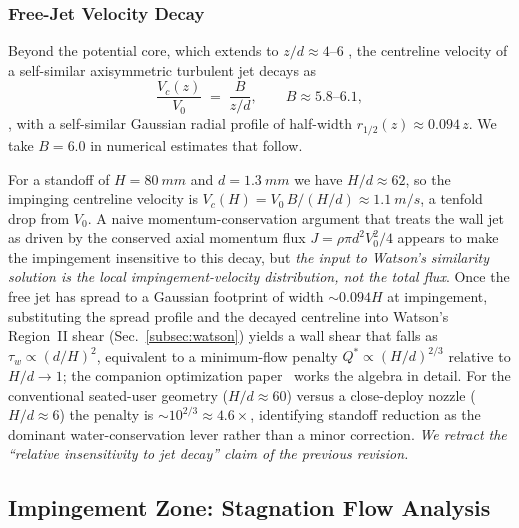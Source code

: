 \documentclass[aps,prfluids,reprint,amsmath,amssymb,floatfix]{revtex4-2}
\begin{document}
\subsubsection{Free-Jet Velocity Decay}

Beyond the potential core, which extends to $z/d \approx 4$--$6$
\citep{HusseinCappGeorge1994,PopeBook}, the centreline velocity of a
self-similar axisymmetric turbulent jet decays as
\begin{equation}
    \frac{V_c(z)}{V_0} \;=\; \frac{B}{z/d},
    \qquad B \approx 5.8\text{--}6.1,
    \label{eq:jetdecay}
\end{equation}
\citep{HusseinCappGeorge1994,PopeBook}, with a self-similar Gaussian
radial profile of half-width $r_{1/2}(z) \approx 0.094\,z$. We take
$B = 6.0$ in numerical estimates that follow.

For a standoff of $H = \SI{80}{mm}$ and $d = \SI{1.3}{mm}$ we have
$H/d \approx 62$, so the impinging centreline velocity is
$V_c(H) = V_0\,B/(H/d) \approx \SI{1.1}{m/s}$, a tenfold drop from $V_0$.
A naive momentum-conservation argument that treats the wall jet as
driven by the conserved axial momentum flux $J = \rho \pi d^2 V_0^2/4$
appears to make the impingement insensitive to this decay, but \emph{the
input to Watson's similarity solution is the local impingement-velocity
distribution, not the total flux}. Once the free jet has spread to a
Gaussian footprint of width $\sim 0.094 H$ at impingement, substituting
the spread profile and the decayed centreline into Watson's
Region~II shear (Sec.~\ref{subsec:watson}) yields a wall shear that
falls as $\tau_w \propto (d/H)^{2}$, equivalent to a minimum-flow penalty
$Q^* \propto (H/d)^{2/3}$ relative to $H/d \to 1$; the companion
optimization paper~\citep{BurtonOptPaper} works the algebra in detail.
For the conventional seated-user geometry ($H/d \approx 60$) versus a
close-deploy nozzle ($H/d \approx 6$) the penalty is
$\sim 10^{2/3} \approx 4.6\times$, identifying standoff reduction as the
dominant water-conservation lever rather than a minor correction.
\emph{We retract the ``relative insensitivity to jet decay'' claim of
the previous revision.}

\subsection{Impingement Zone: Stagnation Flow Analysis}
\label{subsec:stagnation}
\end{document}
